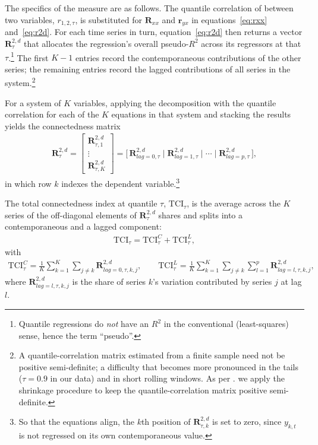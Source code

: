 \documentclass{article}
\begin{document}
The specifics of the \textcite{shahzadetal} measure are as follows. The quantile correlation of \textcite{choishin2022} between two variables, $r_{1,2,\tau}$, is substituted for $\bm{R}_{xx}$ and $\bm{r}_{yx}$ in equations~\ref{eq:rxx} and~\ref{eq:r2d}. For each time series in turn,
equation~\ref{eq:r2d} then returns a vector $\bm{R}^{2,d}_{\tau}$ that allocates
the regression's overall pseudo-$R^2$ across its regressors at that $\tau$.\footnote{Quantile regressions do \emph{not} have an $R^2$ in the conventional (least-squares) sense, hence the term ``pseudo''.} The first $K-1$ entries
record the contemporaneous contributions of the other series; the remaining
entries record the lagged contributions of all series in the system.\footnote{ A quantile-correlation matrix estimated from a finite sample need not be positive
semi-definite; a difficulty that becomes more pronounced in the tails ($\tau=0.9$ in our
data) and in short rolling windows. As per \textcite{shahzadetal}. we
apply the \textcite{schafer2005} shrinkage procedure to keep the quantile-correlation matrix positive semi-definite. } 


For a system of $K$ variables, applying  the decomposition with the quantile correlation for each of the $K$ equations in that system and stacking the results
yields the connectedness matrix
\begin{align}
\bm{R}_{\tau}^{2,d}
  = \begin{bmatrix}
      \bm{R}_{\tau,1}^{2,d} \\ \vdots \\ \bm{R}_{\tau,K}^{2,d}
    \end{bmatrix}
  = \bigl[\, \bm{R}_{lag=0,\tau}^{2,d} \;\big|\; \bm{R}_{lag=1,\tau}^{2,d}
    \;\big|\; \cdots \;\big|\; \bm{R}_{lag=p,\tau}^{2,d} \,\bigr],
\end{align}
in which row $k$ indexes the dependent variable.\footnote{So that the equations align, the $k$th position
of $\bm{R}_{\tau,k}^{2,d}$ is set to zero, since $y_{k,t}$ is not regressed on its
own contemporaneous value.}   


The total connectedness index at quantile $\tau$, $\mathrm{TCI}_{\tau}$, is the average across the $K$ series of the off-diagonal elements of $\bm{R}_{\tau}^{2,d}$ shares and splits into a contemporaneous and a lagged
component:
\begin{align}
\mathrm{TCI}_{\tau} = \mathrm{TCI}_{\tau}^{C} + \mathrm{TCI}_{\tau}^{L},
\end{align}
with
\begin{align}
\mathrm{TCI}_{\tau}^{C}
  = \frac{1}{K}\sum_{k=1}^{K}\sum_{j\neq k}\bm{R}_{lag=0,\tau,k,j}^{2,d},
\qquad
\mathrm{TCI}_{\tau}^{L}
  = \frac{1}{K}\sum_{k=1}^{K}\sum_{j\neq k}\sum_{l=1}^{p}
    \bm{R}_{lag=l,\tau,k,j}^{2,d},
\end{align}
where $\bm{R}_{lag=l,\tau,k,j}^{2,d}$ is the share of series $k$'s variation contributed by
series $j$ at lag $l$. %
\end{document}
